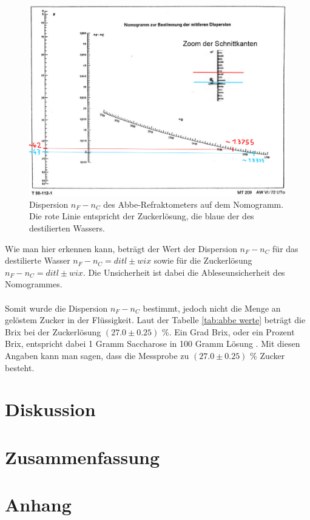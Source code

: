 \documentclass[12pt,a4paper,twoside]{article}
\begin{document}
\begin{figure}[H]
    \centering
    \includegraphics[width=0.6\linewidth]{nudes/nomogramm_auswertung.jpg}
    \caption{Dispersion $n_F-n_C$ des Abbe-Refraktometers auf dem Nomogramm. Die rote Linie entspricht der Zuckerlösung, die blaue der des destilierten Wassers. }
    \label{fig:nomogramm_auswertung}
\end{figure}

\noindent
Wie man hier erkennen kann, beträgt der Wert der Dispersion $n_F-n_C$ für das destilierte Wasser $n_F-n_C = ditl \pm wix$ sowie für die Zuckerlösung $n_F-n_C = ditl \pm wix$. 
Die Unsicherheit ist dabei die Ableseunsicherheit des Nomogrammes. 
\\
\\
Somit wurde die Dispersion $n_F-n_C$ bestimmt, jedoch nicht die Menge an gelöstem Zucker in der Flüssigkeit. 
Laut der Tabelle \ref{tab:abbe werte} beträgt die Brix bei der Zuckerlösung $(27.0 \pm 0.25)$ \%. 
Ein Grad Brix, oder ein Prozent Brix, entspricht dabei 1 Gramm Saccharose in 100 Gramm Lösung \cite{Brix}. 
Mit diesen Angaben kann man sagen, dass die Messprobe zu $(27.0 \pm 0.25)$ \% Zucker besteht. 


\section{Diskussion} %


\section{Zusammenfassung} %


\printbibliography[heading=bibintoc]

\section{Anhang}
\end{document}
